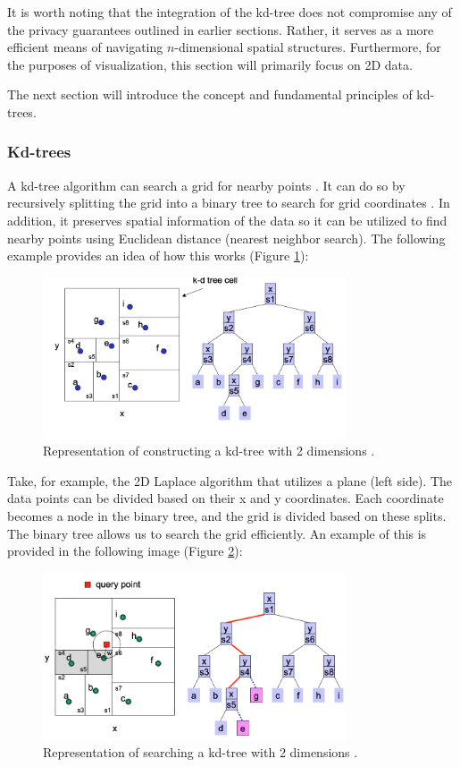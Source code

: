 It is worth noting that the integration of the kd-tree does not compromise any of the privacy guarantees outlined in earlier sections. 
Rather, it serves as a more efficient means of navigating $n$-dimensional spatial structures. 
Furthermore, for the purposes of visualization, this section will primarily focus on 2D data.

The next section will introduce the concept and fundamental principles of kd-trees. 
\newpage
\subsubsection*{Kd-trees} \label{theory:kd-trees}
A kd-tree algorithm can search a grid for nearby points \citep{bentley_multidimensional_1975}.
It can do so by recursively splitting the grid into a binary tree to search for grid coordinates \citep{washington_k-d_2002}.
In addition, it preserves spatial information of the data so it can be utilized to find nearby points using Euclidean distance (nearest neighbor search).
The following example provides an idea of how this works (Figure \ref{fig:kd-tree-theory}):
\begin{figure}[H]
  \includegraphics[width=0.8\textwidth]{TheorethicalFramework/ND-Laplace/Images/kd-tree-part1.png}
  \caption{Representation of constructing a kd-tree with 2 dimensions \citep{washington_k-d_2002}.}
  \label{fig:kd-tree-theory}
\end{figure}
Take, for example, the 2D Laplace algorithm that utilizes a plane (left side).
The data points can be divided based on their x and y coordinates.
Each coordinate becomes a node in the binary tree, and the grid is divided based on these splits.
The binary tree allows us to search the grid efficiently.
An example of this is provided in the following image (Figure \ref{fig:kd-tree-searching-theory}):
\begin{figure}[H]
  \includegraphics[width=0.8\textwidth]{TheorethicalFramework/ND-Laplace/Images/kd-tree-part2.png}
  \caption{Representation of searching a kd-tree with 2 dimensions \citep{washington_k-d_2002}.}
  \label{fig:kd-tree-searching-theory}
\end{figure}
